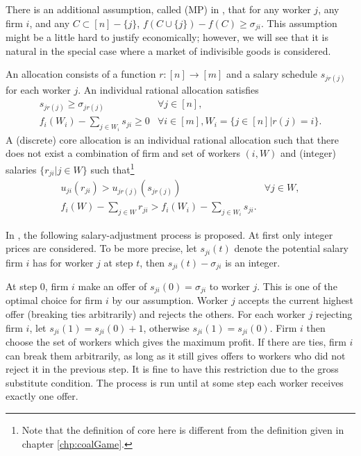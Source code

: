 \documentclass[openany]{book}
\theoremstyle{remark}
\begin{document}
There is an additional assumption, called (MP) in \cite{KC82}, that for any worker $j$, any firm $i$, and any $C\subset[n]-\{j\}$, $f(C\cup\{j\})-f(C)\ge\sigma_{ji}$. This assumption might be a little hard to justify economically; however, we will see that it is natural in the special case where a market of indivisible goods is considered.

An allocation consists of a function $r:[n]\to[m]$ and a salary schedule $s_{jr(j)}$ for each worker $j$. An individual rational allocation satisfies
\begin{equation}
    \begin{array}{ll}
        s_{jr(j)}\ge\sigma_{jr(j)} & \forall j\in[n], \\
        f_i(W_i)-\sum_{j\in W_i}^{}s_{ji}\ge0 & \forall i\in[m],W_i=\{j\in[n]|r(j)=i\}.
    \end{array}
\end{equation}
A (discrete) core allocation is an individual rational allocation such that there does not exist a combination of firm and set of workers $(i,W)$ and (integer) salaries $\{r_{ji}|j\in W\}$ such that\footnote{Note that the definition of core here is different from the definition given in chapter \ref{chp:coalGame}.}
\begin{equation}\label{matchingCore}
    \begin{array}{ll}
        u_{ji}(r_{ji})>u_{jr(j)}(s_{jr(j)}) & \forall j\in W, \\
        f_i(W)-\sum_{j\in W}^{}r_{ji}>f_i(W_i)-\sum_{j\in W_i}^{}s_{ji}.
    \end{array}
\end{equation}

In \cite{KC82}, the following salary-adjustment process is proposed. At first only integer prices are considered. To be more precise, let $s_{ji}(t)$ denote the potential salary firm $i$ has for worker $j$ at step $t$, then $s_{ji}(t)-\sigma_{ji}$ is an integer.

At step $0$, firm $i$ make an offer of $s_{ji}(0)=\sigma_{ji}$ to worker $j$. This is one of the optimal choice for firm $i$ by our assumption. Worker $j$ accepts the current highest offer (breaking ties arbitrarily) and rejects the others. For each worker $j$ rejecting firm $i$, let $s_{ji}(1)=s_{ji}(0)+1$, otherwise $s_{ji}(1)=s_{ji}(0)$. Firm $i$ then choose the set of workers which gives the maximum profit. If there are ties, firm $i$ can break them arbitrarily, as long as it still gives offers to workers who did not reject it in the previous step. It is fine to have this restriction due to the gross substitute condition. The process is run until at some step each worker receives exactly one offer.
\end{document}
